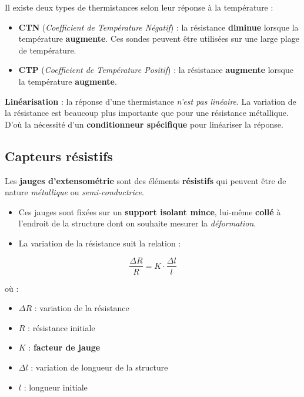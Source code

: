 Il existe deux types de thermistances selon leur réponse à la température :
\begin{itemize}
    \item \textbf{CTN} (\textit{Coefficient de Température Négatif}) : la résistance \textbf{diminue} lorsque la température \textbf{augmente}. Ces sondes peuvent être utilisées sur une large plage de température.
    \item \textbf{CTP} (\textit{Coefficient de Température Positif}) : la résistance \textbf{augmente} lorsque la température \textbf{augmente}.
\end{itemize}

\textbf{Linéarisation} : la réponse d’une thermistance 
\textit{n’est pas linéaire}. La variation de la résistance est beaucoup plus 
importante que pour une résistance métallique. D’où la nécessité d’un 
\textbf{conditionneur spécifique} pour linéariser la réponse.

\subsection{Capteurs résistifs}

Les \textbf{jauges d’extensométrie} sont des éléments \textbf{résistifs} qui 
peuvent être de nature \textit{métallique} ou \textit{semi-conductrice}.  

\begin{itemize}
    \item Ces jauges sont fixées sur un \textbf{support isolant mince}, lui-même \textbf{collé} à l’endroit de la structure dont on souhaite mesurer la \textit{déformation}.
    \item La variation de la résistance suit la relation :
\end{itemize}

\begin{equation}
    \frac{\Delta R}{R} = K \cdot \frac{\Delta l}{l}
\end{equation}

où :
\begin{itemize}
    \item \( \Delta R \) : variation de la résistance
    \item \( R \) : résistance initiale
    \item \( K \) : \textbf{facteur de jauge}
    \item \( \Delta l \) : variation de longueur de la structure
    \item \( l \) : longueur initiale
\end{itemize}

